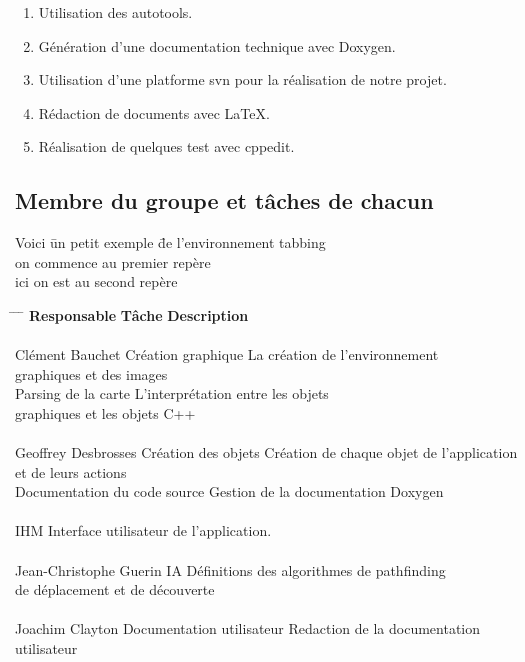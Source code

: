 \documentclass[a4paper 12pts]{article}
\begin{document}
\begin{enumerate}
\item Utilisation des autotools.
\item Génération d'une documentation technique avec Doxygen.
\item Utilisation d'une platforme svn pour la réalisation de notre projet.
\item Rédaction de documents avec \LaTeX .
\item Réalisation de quelques test avec cppedit.

\end{enumerate}

\vspace{075 cm}

\subsection{Membre du groupe et tâches de chacun}


\begin{tabbing}
Voici \= un petit exemple \= de l'environnement tabbing \\
\> on commence au premier repère \\
\> \> ici on est au second repère
\end{tabbing}

\vspace{1 cm}

\begin{tabbing}

\hspace{4cm} \= \hspace{6cm} \= \hspace{2cm} \= \kill
\textbf{Responsable} \> \textbf{Tâche} \> \textbf {Description} \\
\\
Clément Bauchet \> Création graphique \> La création de l'environnement \\
 \> \>graphiques et des images \\					
\> Parsing de la carte \>L'interprétation entre les objets \\
\> \> graphiques et les objets C++\\					
\\
Geoffrey Desbrosses \> Création des objets \> Création de chaque objet de l'application\\
\> \> et de leurs actions\\
\> Documentation du code source \> Gestion de la documentation Doxygen \\ 
\\
\> IHM \> Interface utilisateur de l'application. \> \\
\\
Jean-Christophe Guerin \> IA  \> Définitions des algorithmes de pathfinding\\
\> \> de déplacement et de découverte\\	
\\
Joachim Clayton \> Documentation utilisateur \> Redaction de la documentation utilisateur \\
\\ 
\end{tabbing}
\end{document}
